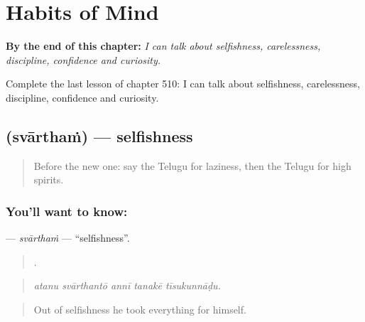 
\chapter{Habits of Mind}
\label{ch:te-habits-of-mind}

\begin{chapteropening}
\textbf{By the end of this chapter:} \emph{I can talk about selfishness, carelessness, discipline, confidence and curiosity.}

Complete the last lesson of chapter 510: I can talk about selfishness, carelessness, discipline, confidence and curiosity.
\end{chapteropening}

\section[\texorpdfstring{\te{స్వార్థం} (svārthaṁ)}{స్వార్థం (svārthaṁ)}]{ (svārthaṁ) — selfishness}

\label{lesson:TE-C510-svartham}



\begin{quote}
Before the new one: say the Telugu for laziness, then the Telugu for high spirits.
\end{quote}

\subsection*{You'll want to know: }
\textbf{} — \emph{svārthaṁ} — \textquotedblleft{}selfishness\textquotedblright{}.

\begin{quote}
    .
\end{quote}

\begin{quote}
\emph{atanu svārthantō annī tanakē tīsukunnāḍu.}
\end{quote}

\begin{quote}
Out of selfishness he took everything for himself.
\end{quote}

